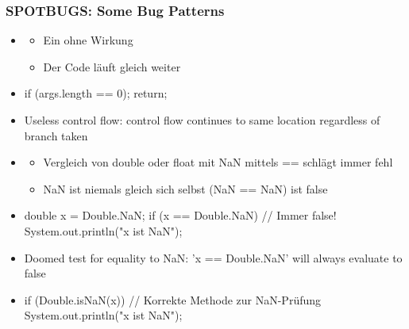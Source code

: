 \subsubsection*{SPOTBUGS: Some Bug Patterns}
\begin{infoBox}[title=Nutzloser Kontrollfluss zur nächsten Zeile (Useless Control Flow to next Line)]
    \begin{itemize}
        \item {}
        \begin{itemize}
            \item Ein  ohne Wirkung
            \item Der Code läuft  gleich weiter
        \end{itemize}
        \item {}
        \begin{codeBlock}{}
            if (args.length == 0);
                return;
        \end{codeBlock}
        \item {}
        \begin{codeBlock}{}
            Useless control flow: control flow continues to same location regardless of branch taken
        \end{codeBlock}
    \end{itemize}
\end{infoBox}
\begin{infoBox}[title=Sinnloser Vergleich mit NaN (Doomed Test for Equality to NaN)]
    \begin{itemize}
        \item {}
        \begin{itemize}
            \item Vergleich von double oder float mit NaN mittels == schlägt immer fehl
            \item NaN ist niemals gleich sich selbst (NaN == NaN) ist false
        \end{itemize}
        \item {}
        \begin{codeBlock}{}
            double x = Double.NaN;
            if (x == Double.NaN){ // Immer false!
                System.out.println("x ist NaN");
            }
        \end{codeBlock}
        \item {}
        \begin{codeBlock}{}
            Doomed test for equality to NaN: 'x == Double.NaN' will always evaluate to false
        \end{codeBlock}
        \item {}
        \begin{codeBlock}{}
            if (Double.isNaN(x)){ // Korrekte Methode zur NaN-Prüfung
                System.out.println("x ist NaN");
            }
        \end{codeBlock}
    \end{itemize}
\end{infoBox}
